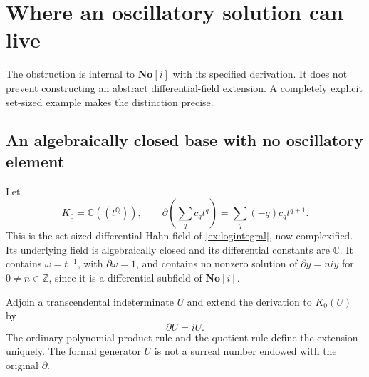 \documentclass[11pt,a4paper]{article}
\theoremstyle{definition}
\newcommand{\SC}{\mathbf{No}[i]}
\newcommand{\C}{\mathbb C}
\newcommand{\Q}{\mathbb Q}
\newcommand{\Z}{\mathbb Z}
\newcommand{\D}{\partial}
\numberwithin{equation}{section}
\begin{document}
\section{Where an oscillatory solution can live}\label{sec:PV}

The obstruction is internal to $\SC$ with its specified derivation. It
does not prevent constructing an abstract differential-field extension.
A completely explicit set-sized example makes the distinction precise.

\subsection{An algebraically closed base with no oscillatory element}
Let
\[
 K_0=\C((t^\Q)),\qquad
 \D\!\left(\sum_qc_qt^q\right)=\sum_q(-q)c_qt^{q+1}.
\]
This is the set-sized differential Hahn field of
\cref{ex:logintegral}, now complexified. Its underlying field is
algebraically closed and its differential constants are $\C$. It contains
$\omega=t^{-1}$, with $\D\omega=1$, and contains no nonzero solution of
$\D y=niy$ for $0\ne n\in\Z$, since it is a differential subfield of
$\SC$.

Adjoin a transcendental indeterminate $U$ and extend the derivation to
$K_0(U)$ by
\begin{equation}\label{eq:PVU}
 \D U=iU.
\end{equation}
The ordinary polynomial product rule and the quotient rule define the
extension uniquely. The formal generator $U$ is not a surreal number
endowed with the original $\D$.
\end{document}
